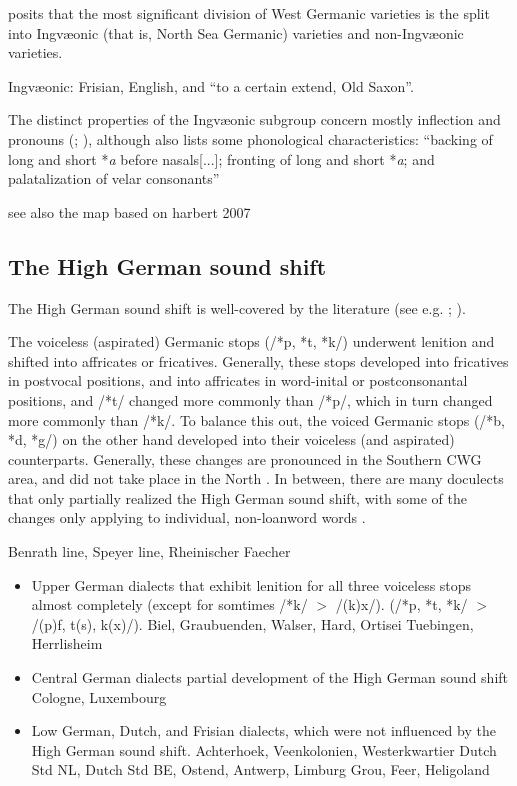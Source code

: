 \documentclass[a4paper]{article}
\begin{document}
\citet{stiles2013pan-west} posits that the most significant division of West Germanic varieties is the split into Ingv\ae{}onic (that is, North Sea Germanic) varieties and non-Ingv\ae{}onic varieties.

Ingv\ae{}onic: Frisian, English, and ``to a certain extend, Old Saxon''.

The distinct properties of the Ingv\ae{}onic subgroup
concern mostly inflection and pronouns (\citet{stiles2013pan-west}; \citet[pp. 7-8]{harbert2007germanic}),
although \citet{stiles2013pan-west} also lists some phonological characteristics:
``backing of long and short *\textit{a} before nasals[...]; fronting of long and short *\textit{a}; and palatalization of velar consonants''

see also the map based on harbert 2007

\subsection{The High German sound shift}


The High German sound shift is well-covered by the literature
(see e.g. \citep[pp. 47--48]{harbert2007germanic}; \cite[pp. 62--64]{koenig2015dtv}).

The voiceless (aspirated) Germanic stops (/*p, *t, *k/)
underwent lenition and shifted into affricates or fricatives.
Generally, these stops developed into fricatives in postvocal positions,
and into affricates in word-inital or postconsonantal positions,
and /*t/ changed more commonly than /*p/,
which in turn changed more commonly than /*k/.
To balance this out,
the voiced Germanic stops (/*b, *d, *g/) on the other hand
developed into their voiceless (and aspirated) counterparts.
Generally, these changes are pronounced
in the Southern CWG area, and did not take place in the North
\cite{noble1983modern}. %
In between, there are many doculects
that only partially realized the High German sound shift,
with some of the changes only applying to individual, non-loanword words
\citet[p. 63]{koenig2015dtv}.

Benrath line, Speyer line, Rheinischer Faecher %

\begin{itemize}
\item
Upper German dialects
that exhibit lenition for all three voiceless stops almost completely
(except for somtimes /*k/ $>$ /(k)x/).
(/*p, *t, *k/ $>$ /(p)f, t(s), k(x)/).
Biel, Graubuenden, Walser, Hard, Ortisei
Tuebingen, Herrlisheim

\item
Central German dialects
partial development of the High German sound shift
Cologne, Luxembourg

\item
Low German, Dutch, and Frisian dialects,
which were not influenced by the High German sound shift.
Achterhoek, Veenkolonien, Westerkwartier
Dutch Std NL, Dutch Std BE, Ostend, Antwerp, Limburg  
Grou, Feer, Heligoland
\end{itemize}
\end{document}
